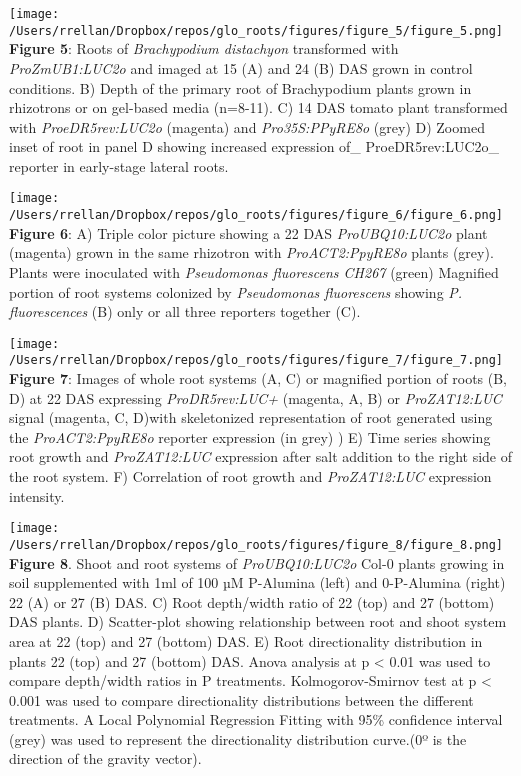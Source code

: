 \documentclass[]{article}
\begin{document}
\texttt{[image: /Users/rrellan/Dropbox/repos/glo\_roots/figures/figure\_5/figure\_5.png]}\\\textbf{Figure
5}: Roots of \emph{Brachypodium distachyon} transformed with
\emph{ProZmUB1:LUC2o} and imaged at 15 (A) and 24 (B) DAS grown in
control conditions. B) Depth of the primary root of Brachypodium plants
grown in rhizotrons or on gel-based media (n=8-11). C) 14 DAS tomato
plant transformed with \emph{ProeDR5rev:LUC2o} (magenta) and
\emph{Pro35S:PPyRE8o} (grey) D) Zoomed inset of root in panel D showing
increased expression of\_ ProeDR5rev:LUC2o\_ reporter in early-stage
lateral roots.

\texttt{[image: /Users/rrellan/Dropbox/repos/glo\_roots/figures/figure\_6/figure\_6.png]}\\\textbf{Figure
6}: A) Triple color picture showing a 22 DAS \emph{ProUBQ10:LUC2o} plant
(magenta) grown in the same rhizotron with \emph{ProACT2:PpyRE8o} plants
(grey). Plants were inoculated with \emph{Pseudomonas fluorescens CH267}
(green) Magnified portion of root systems colonized by \emph{Pseudomonas
fluorescens} showing \emph{P. fluorescences} (B) only or all three
reporters together (C).

\texttt{[image: /Users/rrellan/Dropbox/repos/glo\_roots/figures/figure\_7/figure\_7.png]}\\\textbf{Figure
7}: Images of whole root systems (A, C) or magnified portion of roots
(B, D) at 22 DAS expressing \emph{ProDR5rev:LUC+} (magenta, A, B) or
\emph{ProZAT12:LUC} signal (magenta, C, D)with skeletonized
representation of root generated using the \emph{ProACT2:PpyRE8o}
reporter expression (in grey) ) E) Time series showing root growth and
\emph{ProZAT12:LUC} expression after salt addition to the right side of
the root system. F) Correlation of root growth and \emph{ProZAT12:LUC}
expression intensity.

\texttt{[image: /Users/rrellan/Dropbox/repos/glo\_roots/figures/figure\_8/figure\_8.png]}\\\textbf{Figure
8}. Shoot and root systems of \emph{ProUBQ10:LUC2o} Col-0 plants growing
in soil supplemented with 1ml of 100 µM P-Alumina (left) and 0-P-Alumina
(right) 22 (A) or 27 (B) DAS. C) Root depth/width ratio of 22 (top) and
27 (bottom) DAS plants. D) Scatter-plot showing relationship between
root and shoot system area at 22 (top) and 27 (bottom) DAS. E) Root
directionality distribution in plants 22 (top) and 27 (bottom) DAS.
Anova analysis at p \textless{} 0.01 was used to compare depth/width
ratios in P treatments. Kolmogorov-Smirnov test at p \textless{} 0.001
was used to compare directionality distributions between the different
treatments. A Local Polynomial Regression Fitting with 95\% confidence
interval (grey) was used to represent the directionality distribution
curve.(0º is the direction of the gravity vector).
\end{document}

